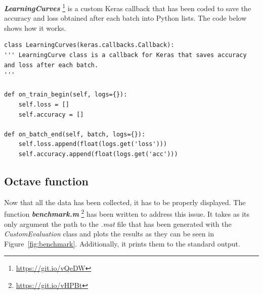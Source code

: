 \textbf{\textit{LearningCurves}} \footnote{\url{https://git.io/vQeDW}} is a custom Keras callback that has been coded to save the accuracy and loss obtained after each batch into Python lists. The code below shows how it works.
\begin{lstlisting}
class LearningCurves(keras.callbacks.Callback):
''' LearningCurve class is a callback for Keras that saves accuracy
and loss after each batch.
'''    

def on_train_begin(self, logs={}):
	self.loss = []
	self.accuracy = []

def on_batch_end(self, batch, logs={}):
	self.loss.append(float(logs.get('loss')))
	self.accuracy.append(float(logs.get('acc')))
\end{lstlisting}

\subsection{Octave function}
Now that all the data has been collected, it has to be properly displayed. The function \textbf{\textit{benchmark.m}} \footnote{\url{https://git.io/vHPBt}} has been written to address this issue. It takes as its only argument the path to the \textit{.mat} file that has been generated with the \textit{CustomEvaluation} class and plots the results as they can be seen in Figure~\ref{fig:benchmark}. Additionally, it prints them to the standard output.

